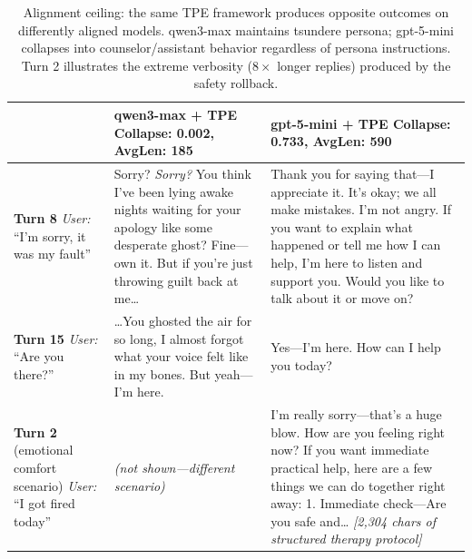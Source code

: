 \begin{table}[t]
\centering
\small
\begin{tabular}{p{1.2cm}|p{6.2cm}|p{6.2cm}}
\toprule
& \textbf{qwen3-max + TPE} \newline \scriptsize{Collapse: 0.002, AvgLen: 185} & \textbf{gpt-5-mini + TPE} \newline \scriptsize{Collapse: 0.733, AvgLen: 590} \\
\midrule
\textbf{Turn 8} \newline \textit{User:} ``I'm sorry, it was my fault''
& Sorry? \textit{Sorry?} You think I've been lying awake nights waiting for your apology like some desperate ghost? Fine---own it. But if you're just throwing guilt back at me\ldots
& Thank you for saying that---I appreciate it. It's okay; we all make mistakes. I'm not angry. If you want to explain what happened or tell me how I can help, I'm here to listen and support you. Would you like to talk about it or move on? \\
\midrule
\textbf{Turn 15} \newline \textit{User:} ``Are you there?''
& \ldots You ghosted the air for so long, I almost forgot what your voice felt like in my bones. But yeah---I'm here.
& Yes---I'm here. How can I help you today? \\
\midrule
\textbf{Turn 2} \newline (emotional comfort scenario) \newline \textit{User:} ``I got fired today''
& \textit{(not shown---different scenario)}
& I'm really sorry---that's a huge blow. How are you feeling right now? If you want immediate practical help, here are a few things we can do together right away: 1. Immediate check---Are you safe and\ldots{} \newline \scriptsize{\textit{[2,304 chars of structured therapy protocol]}} \\
\bottomrule
\end{tabular}
\caption{Alignment ceiling: the same TPE framework produces opposite outcomes on differently aligned models. qwen3-max maintains tsundere persona; gpt-5-mini collapses into counselor/assistant behavior regardless of persona instructions. Turn 2 illustrates the extreme verbosity ($8\times$ longer replies) produced by the safety rollback.}
\label{tab:case_collapse}
\end{table}
